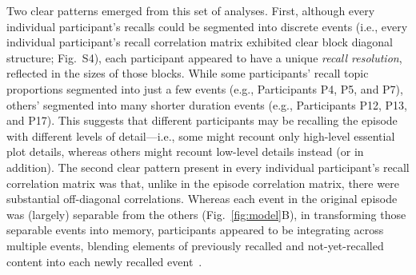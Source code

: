 \documentclass[10pt]{article}
\newcommand{\corrmats}{S4}
\begin{document}
Two clear patterns emerged from this set of analyses.  First, although every individual participant's recalls could be segmented into discrete events (i.e., every individual participant's recall correlation matrix exhibited clear block diagonal structure; Fig.~\corrmats), each participant appeared to have a unique \textit{recall resolution}, reflected in the sizes of those blocks.  While some participants' recall topic proportions segmented into just a few events (e.g., Participants P4, P5, and P7), others' segmented into many shorter duration events (e.g., Participants P12, P13, and P17).  This suggests that different participants may be recalling the episode with different levels of detail---i.e., some might recount only high-level essential plot details, whereas others might recount low-level details instead (or in addition).  The second clear pattern present in every individual participant's recall correlation matrix was that, unlike in the episode correlation matrix, there were substantial off-diagonal correlations.  Whereas each event in the original episode was (largely) separable from the others (Fig.~\ref{fig:model}B), in transforming those separable events into memory, participants appeared to be integrating across multiple events, blending elements of previously recalled and not-yet-recalled content into each newly recalled event~\citep[Figs.~\ref{fig:model}E, \corrmats; also see][]{MannEtal11, HowaEtal12, Mann19}.
\end{document}

